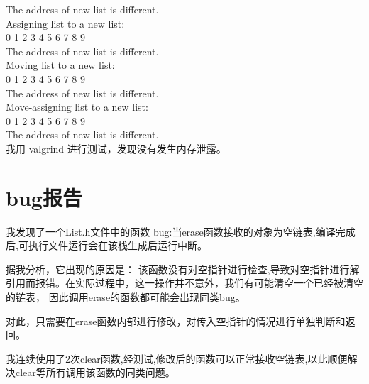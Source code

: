 \documentclass[UTF8]{ctexart}
\begin{document}
The address of new list is different.\\
Assigning list to a new list:\\
0 1 2 3 4 5 6 7 8 9 \\
The address of new list is different.\\
Moving list to a new list:\\
0 1 2 3 4 5 6 7 8 9 \\
The address of new list is different.\\
Move-assigning list to a new list:\\
0 1 2 3 4 5 6 7 8 9 \\
The address of new list is different.\\
我用 valgrind 进行测试，发现没有发生内存泄露。\\

\section{bug报告}

我发现了一个List.h文件中的函数 bug:当erase函数接收的对象为空链表,编译完成后,可执行文件运行会在该栈生成后运行中断。\par
据我分析，它出现的原因是：
该函数没有对空指针进行检查,导致对空指针进行解引用而报错。在实际过程中，这一操作并不意外，我们有可能清空一个已经被清空的链表，
因此调用erase的函数都可能会出现同类bug。\par
对此，只需要在erase函数内部进行修改，对传入空指针的情况进行单独判断和返回。\par
我连续使用了2次clear函数,经测试,修改后的函数可以正常接收空链表,以此顺便解决clear等所有调用该函数的同类问题。\par
\end{document}
